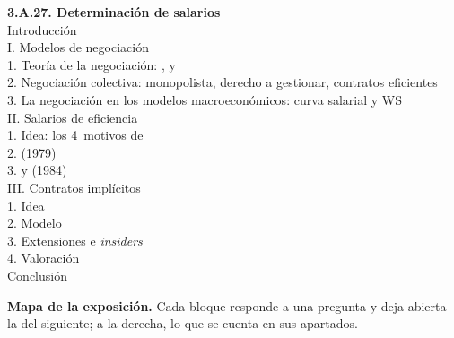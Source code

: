 \documentclass[11pt]{article}
\begin{document}
\begin{esquema}
\textbf{3.A.27. Determinación de salarios}\\[2pt]
Introducción\\
I. Modelos de negociación\\
\hspace*{1.5em}1. Teoría de la negociación: ,  y \\
\hspace*{1.5em}2. Negociación colectiva: monopolista, derecho a gestionar, contratos eficientes\\
\hspace*{1.5em}3. La negociación en los modelos macroeconómicos: curva salarial y WS\\
II. Salarios de eficiencia\\
\hspace*{1.5em}1. Idea: los 4~motivos de \\
\hspace*{1.5em}2.  (1979)\\
\hspace*{1.5em}3.  y  (1984)\\
III. Contratos implícitos\\
\hspace*{1.5em}1. Idea\\
\hspace*{1.5em}2. Modelo\\
\hspace*{1.5em}3. Extensiones e \emph{insiders}\\
\hspace*{1.5em}4. Valoración\\
Conclusión
\end{esquema}

\begin{anotaciones}
\textbf{Mapa de la exposición.} Cada bloque responde a una pregunta y deja abierta la del siguiente; a la derecha, lo que se cuenta en sus apartados.
\begin{infografiacaja}
\caption{Mapa de la exposición: la pregunta de cada bloque y el hilo que los une}\label{figu:mapa-tema}
\end{infografiacaja}
\end{anotaciones}



\end{document}

